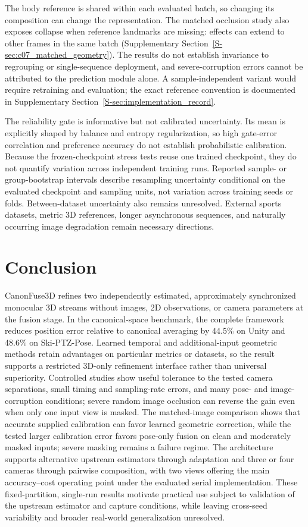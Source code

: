 \documentclass[preprint,12pt]{elsarticle}
\begin{document}
The body reference is shared within each evaluated batch, so changing its composition can change the representation. The matched occlusion study also exposes collapse when reference landmarks are missing: effects can extend to other frames in the same batch (Supplementary Section~\ref{S-sec:c07_matched_geometry}). The results do not establish invariance to regrouping or single-sequence deployment, and severe-corruption errors cannot be attributed to the prediction module alone. A sample-independent variant would require retraining and evaluation; the exact reference convention is documented in Supplementary Section~\ref{S-sec:implementation_record}.

The reliability gate is informative but not calibrated uncertainty. Its mean is explicitly shaped by balance and entropy regularization, so high gate-error correlation and preference accuracy do not establish probabilistic calibration. Because the frozen-checkpoint stress tests reuse one trained checkpoint, they do not quantify variation across independent training runs. Reported sample- or group-bootstrap intervals describe resampling uncertainty conditional on the evaluated checkpoint and sampling units, not variation across training seeds or folds. Between-dataset uncertainty also remains unresolved. External sports datasets, metric 3D references, longer asynchronous sequences, and naturally occurring image degradation remain necessary directions.

\section{Conclusion}
\label{sec:conclusion}

CanonFuse3D refines two independently estimated, approximately synchronized monocular 3D streams without images, 2D observations, or camera parameters at the fusion stage. In the canonical-space benchmark, the complete framework reduces position error relative to canonical averaging by 44.5\% on Unity and 48.6\% on Ski-PTZ-Pose. Learned temporal and additional-input geometric methods retain advantages on particular metrics or datasets, so the result supports a restricted 3D-only refinement interface rather than universal superiority. Controlled studies show useful tolerance to the tested camera separations, small timing and sampling-rate errors, and many pose- and image-corruption conditions; severe random image occlusion can reverse the gain even when only one input view is masked. The matched-image comparison shows that accurate supplied calibration can favor learned geometric correction, while the tested larger calibration error favors pose-only fusion on clean and moderately masked inputs; severe masking remains a failure regime. The architecture supports alternative upstream estimators through adaptation and three or four cameras through pairwise composition, with two views offering the main accuracy--cost operating point under the evaluated serial implementation. These fixed-partition, single-run results motivate practical use subject to validation of the upstream estimator and capture conditions, while leaving cross-seed variability and broader real-world generalization unresolved.
\end{document}
